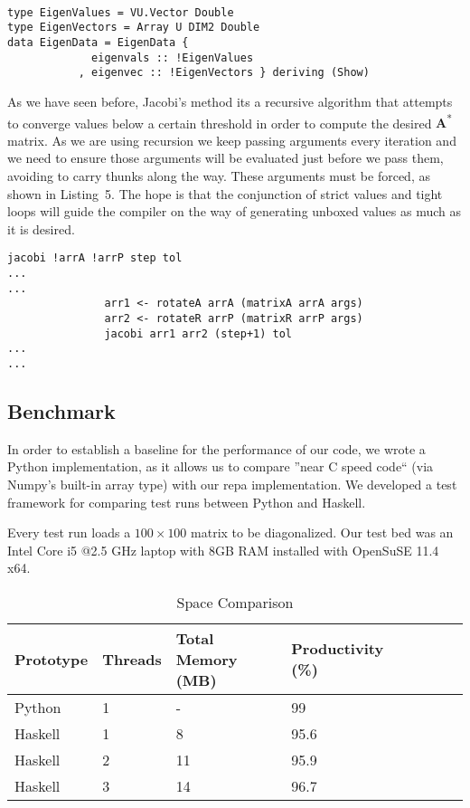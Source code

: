 \documentclass{tmr}
\begin{document}
\begin{lstlisting}[float,captionpos=b,belowcaptionskip=4pt, caption= Strict data types for eigenvalue operations]

type EigenValues = VU.Vector Double
type EigenVectors = Array U DIM2 Double
data EigenData = EigenData {
             eigenvals :: !EigenValues
           , eigenvec :: !EigenVectors } deriving (Show)

\end{lstlisting}

As we have seen before, Jacobi's method its a recursive algorithm that
attempts to converge values below a certain threshold in order to
compute the desired {\textbf A\textsuperscript{*}} matrix.  As we are
using recursion we keep passing arguments every iteration and we need to
ensure those arguments will be evaluated just before we pass them,
avoiding to carry thunks along the way. These arguments must be forced,
as shown in Listing~5. The hope is that the conjunction of strict values
and tight loops will guide the compiler on the way of generating unboxed values as much as it is desired.

\begin{lstlisting}[float,captionpos=b,belowcaptionskip=4pt, caption= Jacobi strict argument passing]
jacobi !arrA !arrP step tol
...
...
               arr1 <- rotateA arrA (matrixA arrA args)
               arr2 <- rotateR arrP (matrixR arrP args)
               jacobi arr1 arr2 (step+1) tol
...
...
\end{lstlisting}

\subsection{Benchmark}

In order to establish a baseline for the performance of our code, we
wrote a Python implementation, as it allows us to compare ''near C speed
code`` (via Numpy's built-in array type) with our repa implementation.
We developed a test framework for comparing test runs between Python and
Haskell.

Every test run loads a $100\times 100$ matrix to be diagonalized.  Our
test bed was an Intel Core i5 @2.5 GHz laptop with 8GB RAM installed
with OpenSuSE 11.4 x64.

\begin{table}[float,captionpos=b,belowcaptionskip=4pt]
\begin{center}
    \begin{tabular}{ | l | l | l | l | l | l | l| l |}
\hline  Prototype & Threads & Total Memory (MB) & Productivity (\%) \\ 
\hline  Python  & 1 & -  & 99   \\
\hline  Haskell & 1 & 8  & 95.6  \\
\hline  Haskell & 2 & 11 & 95.9  \\
\hline  Haskell & 3 & 14 & 96.7   \\
\hline
    \end{tabular} 
\end{center}
\label{tab:first}
\caption{Space Comparison}
\end{table}
\end{document}
